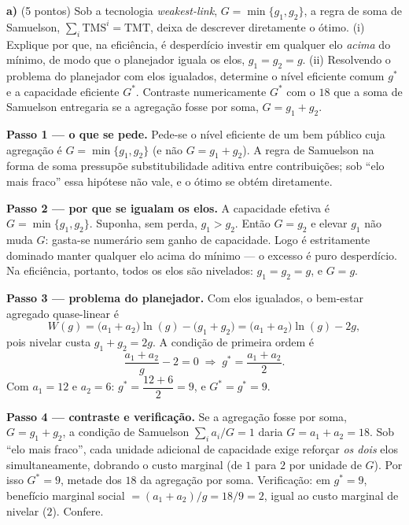 \textbf{a)} (5 pontos) Sob a tecnologia \emph{weakest-link}, $G=\min\{g_1,g_2\}$, a regra de soma de Samuelson, $\sum_i \text{TMS}^i=\text{TMT}$, deixa de descrever diretamente o ótimo. (i) Explique por que, na eficiência, é desperdício investir em qualquer elo \emph{acima} do mínimo, de modo que o planejador iguala os elos, $g_1=g_2=g$. (ii) Resolvendo o problema do planejador com elos igualados, determine o nível eficiente comum $g^{*}$ e a capacidade eficiente $G^{*}$. Contraste numericamente $G^{*}$ com o $18$ que a soma de Samuelson entregaria se a agregação fosse por soma, $G=g_1+g_2$.
\resolucaobox{7.2cm}
\begin{solucao}
\textbf{Passo 1 --- o que se pede.} Pede-se o nível eficiente de um bem público cuja agregação é $G=\min\{g_1,g_2\}$ (e não $G=g_1+g_2$). A regra de Samuelson na forma de soma pressupõe substitubilidade aditiva entre contribuições; sob ``elo mais fraco'' essa hipótese não vale, e o ótimo se obtém diretamente.

\textbf{Passo 2 --- por que se igualam os elos.} A capacidade efetiva é $G=\min\{g_1,g_2\}$. Suponha, sem perda, $g_1>g_2$. Então $G=g_2$ e elevar $g_1$ não muda $G$: gasta-se numerário sem ganho de capacidade. Logo é estritamente dominado manter qualquer elo acima do mínimo --- o excesso é puro desperdício. Na eficiência, portanto, todos os elos são nivelados: $g_1=g_2=g$, e $G=g$.

\textbf{Passo 3 --- problema do planejador.} Com elos igualados, o bem-estar agregado quase-linear é
\[
W(g)=\big(a_1+a_2\big)\ln(g)-\big(g_1+g_2\big)=\big(a_1+a_2\big)\ln(g)-2g,
\]
pois nivelar custa $g_1+g_2=2g$. A condição de primeira ordem é
\[
\frac{a_1+a_2}{g}-2=0\;\Longrightarrow\; g^{*}=\frac{a_1+a_2}{2}.
\]
Com $a_1=12$ e $a_2=6$: $g^{*}=\dfrac{12+6}{2}=9$, e $G^{*}=g^{*}=9$.

\textbf{Passo 4 --- contraste e verificação.} Se a agregação fosse por soma, $G=g_1+g_2$, a condição de Samuelson $\sum_i a_i/G=1$ daria $G=a_1+a_2=18$. Sob ``elo mais fraco'', cada unidade adicional de capacidade exige reforçar \emph{os dois} elos simultaneamente, dobrando o custo marginal (de $1$ para $2$ por unidade de $G$). Por isso $G^{*}=9$, metade dos $18$ da agregação por soma. Verificação: em $g^{*}=9$, benefício marginal social $=(a_1+a_2)/g=18/9=2$, igual ao custo marginal de nivelar ($2$). Confere.


\end{solucao}
